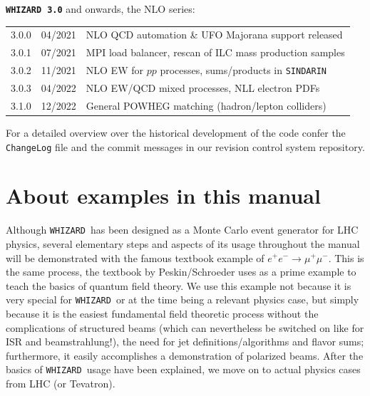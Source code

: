 \documentclass[12pt]{book}
\newcommand{\ttt}[1]{\texttt{#1}}
\newcommand{\whizard}{\ttt{WHIZARD}}
\newcommand{\sindarin}{\ttt{SINDARIN}}
\begin{document}
\vspace{2cm}

{
{\bf \whizard\ \texttt{3.0}} and onwards, the NLO series:
\nopagebreak[4]
\begin{center}
  \begin{tabular}{|l|l|l|}\hline
    3.0.0 & 04/2021 & NLO QCD automation \& UFO Majorana support
    released
    \\
    3.0.1 & 07/2021 & MPI load balancer, rescan of ILC mass production
    samples
    \\
    3.0.2 & 11/2021 & NLO EW for $pp$ processes, sums/products in
    \sindarin\
    \\
    3.0.3 & 04/2022 & NLO EW/QCD mixed processes, NLL electron PDFs
    \\\hline
    3.1.0 & 12/2022 & General POWHEG matching (hadron/lepton colliders)
    \\\hline\hline
  \end{tabular}
\end{center}
}

\vspace{.5cm}

For a detailed overview over the historical development of the code
confer the \ttt{ChangeLog} file and the commit messages in our
revision control system repository.

\newpage


\section{About examples in this manual}

Although \whizard\ has been designed as a Monte Carlo event generator
for LHC physics, several elementary steps and aspects of its usage
throughout the manual will be demonstrated with the famous textbook
example of $e^+e^- \to \mu^+ \mu^-$. This is the same process, the
textbook by Peskin/Schroeder \cite{PeskinSchroeder} uses as a prime
example to teach the basics of quantum field theory. We use this
example not because it is very special for \whizard\ or at the time
being a relevant physics case, but simply because it is the easiest
fundamental field theoretic process without the complications of
structured beams (which can nevertheless be switched on like for ISR
and beamstrahlung!), the need for jet definitions/algorithms and
flavor sums; furthermore, it easily accomplishes a demonstration of
polarized beams. After the basics of \whizard\ usage have been
explained, we move on to actual physics cases from LHC (or Tevatron).
\end{document}
